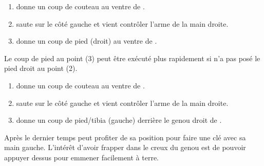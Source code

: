 \begin{technique}

\begin{enumerate}
	\item \A donne un coup de couteau au ventre de \D.
	
	\item \D saute sur le côté gauche et vient contrôler l'arme de la main droite.
	
	\item \D donne un coup de pied (droit) au ventre de \A.
\end{enumerate}

Le coup de pied au point (3) peut être exécuté plus rapidement si \D n'a pas posé le pied droit au point (2).

\end{technique}


\begin{technique}

\begin{enumerate}
	\item \A donne un coup de couteau au ventre de \D.
	
	\item \D saute sur le côté gauche et vient contrôler l'arme de la main droite.
	
	\item \D donne un coup de pied/tibia (gauche) derrière le genou droit de \A.
\end{enumerate}

Après le dernier temps \D peut profiter de sa position pour faire une clé avec sa main gauche.
L'intérêt d'avoir frapper dans le creux du genou est de pouvoir appuyer dessus pour emmener facilement \A à terre.

\end{technique}


